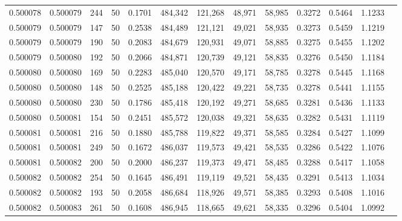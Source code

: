 \begin{tabular}{rrrrrrrrrrrrr}
0.500078 & 0.500079 &   244 &  50 &                                     0.1701 & 484,342 & 121,268 &  48,971 &  58,985 & 0.3272 & 0.5464 & 1.1233 \\
0.500079 & 0.500079 &   147 &  50 &                                     0.2538 & 484,489 & 121,121 &  49,021 &  58,935 & 0.3273 & 0.5459 & 1.1219 \\
0.500079 & 0.500079 &   190 &  50 &                                     0.2083 & 484,679 & 120,931 &  49,071 &  58,885 & 0.3275 & 0.5455 & 1.1202 \\
0.500079 & 0.500080 &   192 &  50 &                                     0.2066 & 484,871 & 120,739 &  49,121 &  58,835 & 0.3276 & 0.5450 & 1.1184 \\
0.500080 & 0.500080 &   169 &  50 &                                     0.2283 & 485,040 & 120,570 &  49,171 &  58,785 & 0.3278 & 0.5445 & 1.1168 \\
0.500080 & 0.500080 &   148 &  50 &                                     0.2525 & 485,188 & 120,422 &  49,221 &  58,735 & 0.3278 & 0.5441 & 1.1155 \\
0.500080 & 0.500080 &   230 &  50 &                                     0.1786 & 485,418 & 120,192 &  49,271 &  58,685 & 0.3281 & 0.5436 & 1.1133 \\
0.500080 & 0.500081 &   154 &  50 &                                     0.2451 & 485,572 & 120,038 &  49,321 &  58,635 & 0.3282 & 0.5431 & 1.1119 \\
0.500081 & 0.500081 &   216 &  50 &                                     0.1880 & 485,788 & 119,822 &  49,371 &  58,585 & 0.3284 & 0.5427 & 1.1099 \\
0.500081 & 0.500081 &   249 &  50 &                                     0.1672 & 486,037 & 119,573 &  49,421 &  58,535 & 0.3286 & 0.5422 & 1.1076 \\
0.500081 & 0.500082 &   200 &  50 &                                     0.2000 & 486,237 & 119,373 &  49,471 &  58,485 & 0.3288 & 0.5417 & 1.1058 \\
0.500082 & 0.500082 &   254 &  50 &                                     0.1645 & 486,491 & 119,119 &  49,521 &  58,435 & 0.3291 & 0.5413 & 1.1034 \\
0.500082 & 0.500082 &   193 &  50 &                                     0.2058 & 486,684 & 118,926 &  49,571 &  58,385 & 0.3293 & 0.5408 & 1.1016 \\
0.500082 & 0.500083 &   261 &  50 &                                     0.1608 & 486,945 & 118,665 &  49,621 &  58,335 & 0.3296 & 0.5404 & 1.0992 \\

\end{tabular}
